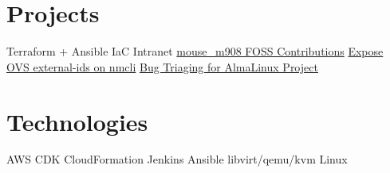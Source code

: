 \documentclass[]{friggeri-cv}
\begin{document}
\begin{aside}
  \section{Projects}
    \bullet\hspace{0.2cm}Terraform + Ansible IaC Intranet
    \bullet\hspace{0.2cm}\href{https://github.com/dokutan/mouse_m908/pull/12}{mouse\_m908 FOSS Contributions}
    \bullet\hspace{0.2cm}\href{https://gitlab.freedesktop.org/NetworkManager/NetworkManager/-/merge_requests/679}{Expose OVS external-ids on nmcli}
    \bullet\hspace{0.2cm}\href{https://bugs.almalinux.org/view.php?id=151}{Bug Triaging for AlmaLinux Project}
    ~
  \section{Technologies}
    \bullet\hspace{0.2cm}AWS CDK
    \bullet\hspace{0.2cm}CloudFormation
    \bullet\hspace{0.2cm}Jenkins
    \bullet\hspace{0.2cm}Ansible
    \bullet\hspace{0.2cm}libvirt/qemu/kvm
    \bullet\hspace{0.2cm}Linux
    ~
\end{aside}
\end{document}
